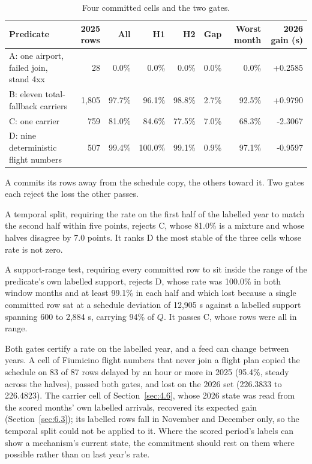 \documentclass[
  manuscript=article,
  layout=preprint,
  year=2026,
  volume=x,
]{extra/joas}
\begin{document}
\begin{table}[htbp!]
  \centering
  \small
  \setlength{\tabcolsep}{5pt}\renewcommand{\arraystretch}{1.15}
  \caption{Four committed cells and the two gates.}
  \label{tab:27}
  \begin{tabularx}{\linewidth}{>{\raggedright\arraybackslash}Xrrrrrrr}
  \toprule
  \textbf{Predicate} & \textbf{2025 rows} & \textbf{All} & \textbf{H1} & \textbf{H2} & \textbf{Gap} & \textbf{Worst month} & \textbf{2026 gain (s)} \\
  \midrule
  A: one airport, failed join, stand 4xx & 28 & 0.0\% & 0.0\% & 0.0\% & 0.0\% & 0.0\% & +0.2585 \\
  B: eleven total-fallback carriers & 1,805 & 97.7\% & 96.1\% & 98.8\% & 2.7\% & 92.5\% & +0.9790 \\
  C: one carrier & 759 & 81.0\% & 84.6\% & 77.5\% & 7.0\% & 68.3\% & -2.3067 \\
  D: nine deterministic flight numbers & 507 & 99.4\% & 100.0\% & 99.1\% & 0.9\% & 97.1\% & -0.9597 \\
  \bottomrule
  \end{tabularx}
\end{table}

A commits its rows away from the schedule copy, the others toward it. Two gates each reject the loss the other passes.

A temporal split, requiring the rate on the first half of the labelled year to match the second half within five points, rejects C, whose 81.0\% is a mixture and whose halves disagree by 7.0 points. It ranks D the most stable of the three cells whose rate is not zero.

A support-range test, requiring every committed row to sit inside the range of the predicate's own labelled support, rejects D, whose rate was 100.0\% in both window months and at least 99.1\% in each half and which lost because a single committed row sat at a schedule deviation of 12,905 s against a labelled support spanning 600 to 2,884 s, carrying 94\% of $Q$. It passes C, whose rows were all in range.

Both gates certify a rate on the labelled year, and a feed can change between years. A cell of Fiumicino flight numbers that never join a flight plan copied the schedule on 83 of 87 rows delayed by an hour or more in 2025 (95.4\%, steady across the halves), passed both gates, and lost on the 2026 set (226.3833 to 226.4823). The carrier cell of Section~\ref{sec:4.6}, whose 2026 state was read from the scored months' own labelled arrivals, recovered its expected gain (Section~\ref{sec:6.3}); its labelled rows fall in November and December only, so the temporal split could not be applied to it. Where the scored period's labels can show a mechanism's current state, the commitment should rest on them where possible rather than on last year's rate.
\end{document}
